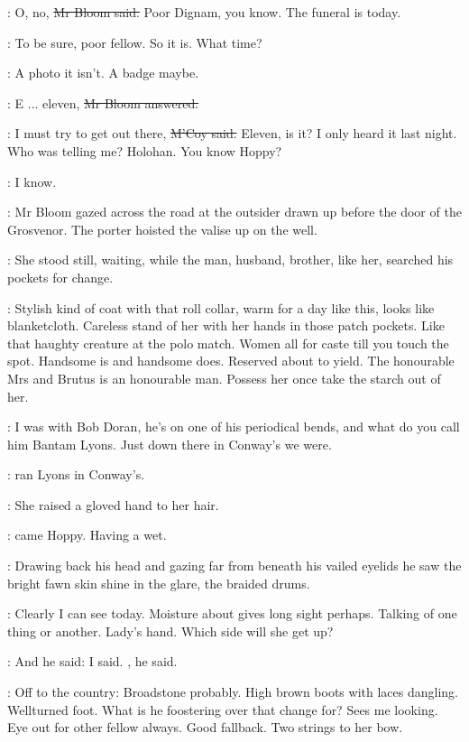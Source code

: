 \Bloom:
O, no, \sout{Mr Bloom said.}
Poor Dignam, you know.
The funeral is today.

\mccoy:
To be sure, poor fellow.
So it is.
What time?

\BloomInt:
A photo it isn't.
A badge maybe.

\Bloom:
E ... eleven,
\sout{Mr Bloom answered.}

\mccoy:
I must try to get out there,
\sout{M'Coy said.}
Eleven, is it?
I only heard it last night.
Who was telling me?
Holohan.
You know Hoppy?

\Bloom:
I know.

:
Mr Bloom gazed across the road at the outsider
drawn up before the door of the Grosvenor.
The porter hoisted the valise up on the well.

:
She stood still, waiting,
while the man, husband, brother,
like her,
searched his pockets for change.

\BloomInt:
Stylish kind of coat with that roll collar,
warm for a day like this,
looks like blanketcloth.
Careless stand of her
with her hands in those patch pockets.
Like that haughty creature at the polo match.
Women all for caste till you touch the spot.
Handsome is and handsome does.
Reserved about to yield.
The honourable Mrs
and Brutus is an honourable man.
Possess her once
take the starch out of her.

\mccoy:
I was with Bob Doran,
he's on one of his periodical bends,
and what do you call him Bantam Lyons.
Just down there in Conway's
we were.

\mccoy:
ran Lyons in Conway's.

:
She raised a gloved hand to her hair.

\mccoy:
came Hoppy.
Having a wet.

:
Drawing back his head
and gazing far from beneath
his vailed eyelids
he saw the bright fawn skin shine in the glare,
the braided drums.

\BloomInt:
Clearly I can see today.
Moisture about gives long sight perhaps.
Talking of one thing or another.
Lady's hand.
Which side will she get up?

\mccoy:
And he said:
 I said.
, he said.

\BloomInt:
Off to the country:
Broadstone probably.
High brown boots with laces dangling.
Wellturned foot.
What is he foostering over that change for?
Sees me looking.
Eye out for other fellow always.
Good fallback.
Two strings to her bow.

